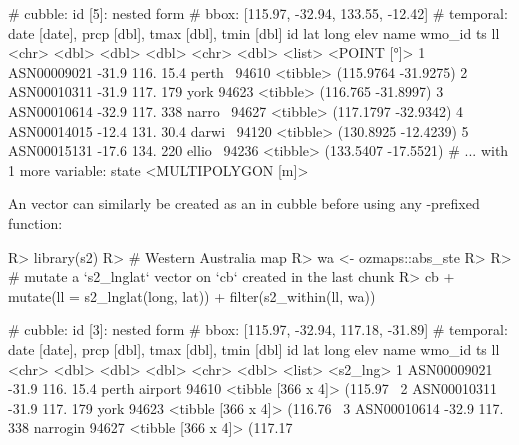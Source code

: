 \documentclass[
]{jss}
\begin{document}
\begin{CodeChunk}
\begin{CodeOutput}
# cubble:   id [5]: nested form
# bbox:     [115.97, -32.94, 133.55, -12.42]
# temporal: date [date], prcp [dbl], tmax [dbl], tmin [dbl]
  id            lat  long  elev name   wmo_id ts                        ll
  <chr>       <dbl> <dbl> <dbl> <chr>   <dbl> <list>           <POINT [°]>
1 ASN00009021 -31.9  116.  15.4 perth~  94610 <tibble> (115.9764 -31.9275)
2 ASN00010311 -31.9  117. 179   york    94623 <tibble>  (116.765 -31.8997)
3 ASN00010614 -32.9  117. 338   narro~  94627 <tibble> (117.1797 -32.9342)
4 ASN00014015 -12.4  131.  30.4 darwi~  94120 <tibble> (130.8925 -12.4239)
5 ASN00015131 -17.6  134. 220   ellio~  94236 <tibble> (133.5407 -17.5521)
# ... with 1 more variable: state <MULTIPOLYGON [m]>
\end{CodeOutput}
\end{CodeChunk}

An   vector can similarly be created as an
 in cubble before using any -prefixed function:

\begin{CodeChunk}
\begin{CodeInput}
R> library(s2)
R> # Western Australia map
R> wa <- ozmaps::abs_ste %
R> 
R> # mutate a `s2_lnglat` vector on `cb` created in the last chunk
R> cb %
+   mutate(ll = s2_lnglat(long, lat)) %
+   filter(s2_within(ll, wa))
\end{CodeInput}
\begin{CodeOutput}
# cubble:   id [3]: nested form
# bbox:     [115.97, -32.94, 117.18, -31.89]
# temporal: date [date], prcp [dbl], tmax [dbl], tmin [dbl]
  id            lat  long  elev name          wmo_id ts                 ll      
  <chr>       <dbl> <dbl> <dbl> <chr>          <dbl> <list>             <s2_lng>
1 ASN00009021 -31.9  116.  15.4 perth airport  94610 <tibble [366 x 4]> (115.97~
2 ASN00010311 -31.9  117. 179   york           94623 <tibble [366 x 4]> (116.76~
3 ASN00010614 -32.9  117. 338   narrogin       94627 <tibble [366 x 4]> (117.17~
\end{CodeOutput}
\end{CodeChunk}
\end{document}
